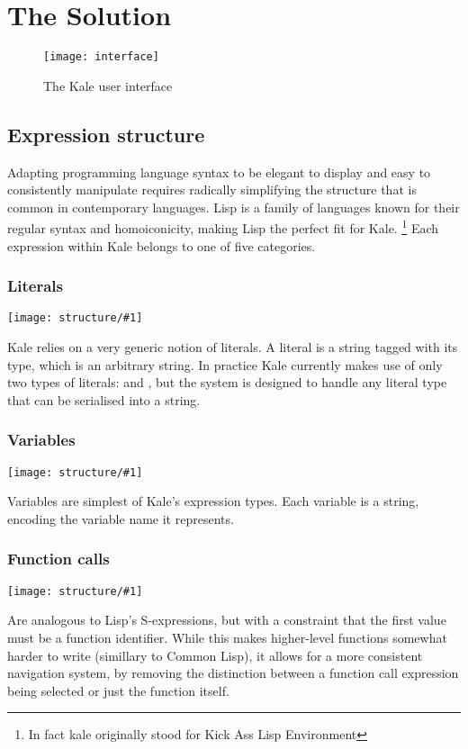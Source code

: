 \chapter{The Solution}

\begin{figure}[t]
\texttt{[image: interface]}
\caption{The Kale user interface}
\end{figure}


\section{Expression structure}

Adapting programming language syntax to be elegant to display and easy to
consistently manipulate requires radically simplifying the structure that is
common in contemporary languages. Lisp \citep{McCarthy1960} is a family of
languages known for their regular syntax and homoiconicity, making Lisp the
perfect fit for Kale.%
\footnote{In fact kale originally stood for Kick Ass Lisp Environment}
Each expression within Kale belongs to one of five categories.

\newcommand{\exprfig}[1]{
  \vspace{-1ex}
  \begin{flushright}
    \texttt{[image: structure/\#1]}
  \end{flushright}
  \vspace{-3ex}
}
\subsection{Literals}
\label{expr:literal}
\exprfig{literal}
Kale relies on a very generic notion of literals. A literal is a string
tagged with its type, which is an arbitrary string. In practice Kale currently
makes use of only two types of literals:  and , but the
system is designed to handle any literal type that can be serialised into a
string.

\subsection{Variables}
\label{expr:variable}
\exprfig{variable}
Variables are simplest of Kale's expression types. Each variable is a string,
encoding the variable name it represents. 

\subsection{Function calls}
\label{expr:function}
\exprfig{function}
Are analogous to Lisp's S-expressions, but with a constraint that the first
value must be a function identifier. While this makes higher-level functions
somewhat harder to write (simillary to Common Lisp), it allows for a more
consistent navigation system, by removing the distinction between a function
call expression being selected or just the function itself.

